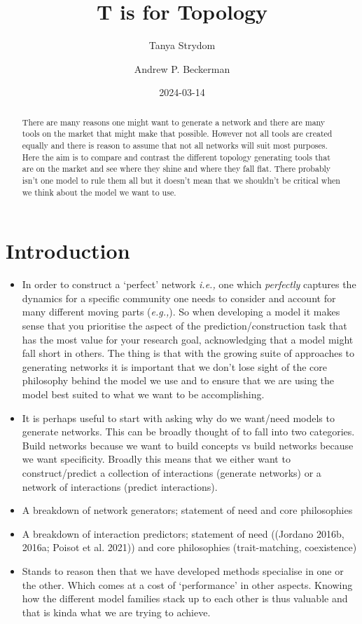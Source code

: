 \documentclass[
  letterpaper,
  DIV=11,
  numbers=noendperiod]{scrartcl}
\title{T is for Topology}
\author{Tanya Strydom \and Andrew P. Beckerman}
\date{2024-03-14}
\begin{document}
\maketitle
\begin{abstract}
There are many reasons one might want to generate a network and there
are many tools on the market that might make that possible. However not
all tools are created equally and there is reason to assume that not all
networks will suit most purposes. Here the aim is to compare and
contrast the different topology generating tools that are on the market
and see where they shine and where they fall flat. There probably isn't
one model to rule them all but it doesn't mean that we shouldn't be
critical when we think about the model we want to use.
\end{abstract}

\section{Introduction}\label{introduction}

\begin{itemize}
\item
  In order to construct a `perfect' network \emph{i.e.,} one which
  \emph{perfectly} captures the dynamics for a specific community one
  needs to consider and account for many different moving parts
  (\emph{e.g.,}). So when developing a model it makes sense that you
  prioritise the aspect of the prediction/construction task that has the
  most value for your research goal, acknowledging that a model might
  fall short in others. The thing is that with the growing suite of
  approaches to generating networks it is important that we don't lose
  sight of the core philosophy behind the model we use and to ensure
  that we are using the model best suited to what we want to be
  accomplishing.
\item
  It is perhaps useful to start with asking why do we want/need models
  to generate networks. This can be broadly thought of to fall into two
  categories. Build networks because we want to build concepts vs build
  networks because we want specificity. Broadly this means that we
  either want to construct/predict a collection of interactions
  (generate networks) or a network of interactions (predict
  interactions).
\item
  A breakdown of network generators; statement of need and core
  philosophies
\item
  A breakdown of interaction predictors; statement of need ((Jordano
  2016b, 2016a; Poisot et al. 2021)) and core philosophies
  (trait-matching, coexistence)
\item
  Stands to reason then that we have developed methods specialise in one
  or the other. Which comes at a cost of `performance' in other aspects.
  Knowing how the different model families stack up to each other is
  thus valuable and that is kinda what we are trying to achieve.
\end{itemize}
\end{document}
